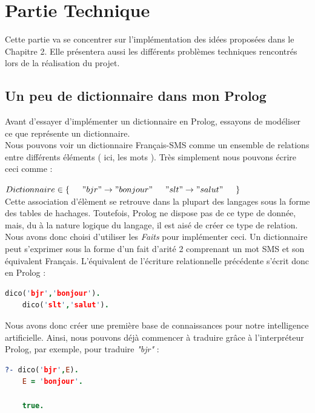 \documentclass[11pt]{report}
\begin{document}
\chapter{Partie Technique}
Cette partie va se concentrer sur l'implémentation des idées proposées dans le Chapitre 2. Elle présentera aussi les différents problèmes techniques rencontrés lors de la réalisation du projet.

	\section{Un peu de dictionnaire dans mon Prolog}
	Avant d'essayer d'implémenter un dictionnaire en Prolog, essayons de modéliser ce que représente un dictionnaire.\\
	Nous pouvons voir un dictionnaire Français-SMS comme un ensemble de relations entre différents éléments ( ici, les mots ). Très simplement nous pouvons écrire ceci comme :\\
	\smallskip
	
		$ 
			Dictionnaire \in \{ \\
			\indent	"bjr" \rightarrow "bonjour"\\
			\indent "slt" \rightarrow "salut"\\
			\indent \}
		$\\
	
	\noindent Cette association d'élèment se retrouve dans la plupart des langages sous la forme des tables de hachages. Toutefois, Prolog ne dispose pas de ce type de donnée, mais, du à la nature logique du langage, il est aisé de créer ce type de relation.\\
	Nous avons donc choisi d'utiliser les \emph{Faits} pour implémenter ceci. Un dictionnaire peut s'exprimer sous la forme d'un fait d'arité 2 comprenant un mot SMS et son équivalent Français. L'équivalent de l'écriture relationnelle précédente s'écrit donc en Prolog :\\
	
	\begin{lstlisting}[language=Prolog]
	dico('bjr','bonjour').
	dico('slt','salut').
	\end{lstlisting}
	
	Nous avons donc créer une première base de connaissances pour notre intelligence artificielle. Ainsi, nous pouvons déjà commencer à traduire grâce à l’interpréteur Prolog, par exemple, pour traduire {\em "bjr"} :
	\begin{lstlisting}[language=Prolog]
	?- dico('bjr',E).
	E = 'bonjour'.
	
	true.
	\end{lstlisting}
	
\end{document}
